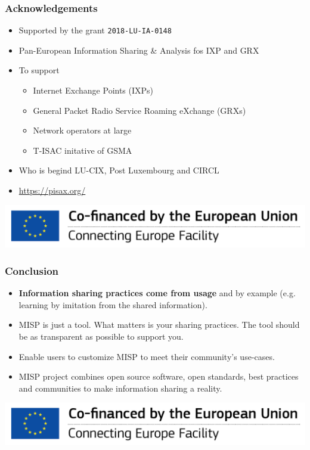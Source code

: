 \begin{frame}
    \frametitle{Acknowledgements}
    \begin{itemize}
        \item Supported by the grant \texttt{2018-LU-IA-0148}
        \item Pan-European Information Sharing \& Analysis fos IXP and GRX
        \item To support
        \begin{itemize}
            \item Internet Exchange Points (IXPs)
            \item General Packet Radio Service Roaming eXchange (GRXs)
            \item Network operators at large
            \item T-ISAC initative of GSMA
        \end{itemize}
        \item Who is begind LU-CIX, Post Luxembourg and CIRCL
        \item \url{https://pisax.org/}
    \end{itemize}
    \begin{center}
        \includegraphics[scale=0.5]{en_cef.png}
    \end{center}
\end{frame}


\begin{frame}
        \frametitle{Conclusion}
        \begin{itemize}
                \item {\bf Information sharing practices come from usage} and by example (e.g. learning by imitation from the shared information).
                \item MISP is just a tool. What matters is your sharing practices. The tool should be as transparent as possible to support you.
                \item Enable users to customize MISP to meet their community's use-cases.
                \item MISP project combines open source software, open standards, best practices and communities to make information sharing a reality.
        \end{itemize}
        \begin{center}
        \includegraphics[scale=0.5]{en_cef.png}
        \end{center}
\end{frame}


